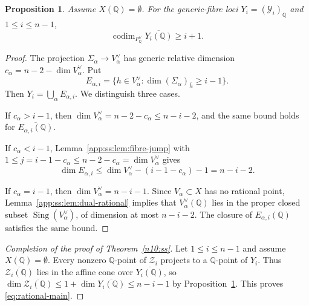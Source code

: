 \documentclass[a4paper,11pt, twoside,reqno]{amsart}
\theoremstyle{plain}
\newtheorem{prop}[thm]{Proposition}
\theoremstyle{definition}
\theoremstyle{remark}
\newcommand{\QQ}{\mathbb{Q}}
\DeclareMathOperator{\codim}{codim}
\DeclareMathOperator{\Sing}{Sing}
\renewcommand{\bar}{\overline}
\renewcommand{\le}{\leqslant}
\renewcommand{\leq}{\leqslant}
\renewcommand{\geq}{\geqslant}
\numberwithin{equation}{section}
\begin{document}
\begin{prop}\label{app:ss:prop:rational-projective}
Assume $X(\QQ)=\emptyset$. For the generic-fibre loci
$Y_i=(\mathcal Y_i)_\QQ$ and $1\leq i\leq n-1$,
\begin{equation*}
 \codim_{P^\vee_\QQ}\bar{Y_i(\QQ)}\geq i+1.
\end{equation*}
\end{prop}
\begin{proof}
The projection $\Sigma_\alpha\to V_\alpha^\vee$ has generic relative
dimension $c_\alpha=n-2-\dim V_\alpha^\vee$. Put
\[
 E_{\alpha,i}=\{h\in V_\alpha^\vee:
                       \dim(\Sigma_\alpha)_{\bar h}\geq i-1\}.
\]
Then $Y_i=\bigcup_\alpha E_{\alpha,i}$. We distinguish three cases.

If $c_\alpha>i-1$, then
$\dim V_\alpha^\vee=n-2-c_\alpha\leq n-i-2$, and the same bound
holds for $\bar{E_{\alpha,i}(\QQ)}$.

If $c_\alpha<i-1$, Lemma~\ref{app:ss:lem:fibre-jump} with
$1\le j=i-1-c_\alpha\le n-2-c_\alpha=\dim V_\alpha^\vee$ gives
\[
 \dim E_{\alpha,i}
 \leq\dim V_\alpha^\vee-(i-1-c_\alpha)-1=n-i-2.
\]

If $c_\alpha=i-1$, then $\dim V_\alpha^\vee=n-i-1$.
Since $V_\alpha\subset X$ has no rational point,
Lemma~\ref{app:ss:lem:dual-rational} implies that $V_\alpha^\vee(\QQ)$ lies in the proper
closed subset $\Sing(V_\alpha^\vee)$, of dimension at most $n-i-2$.
The closure of $E_{\alpha,i}(\QQ)$ satisfies the same bound.
\end{proof}

\begin{proof}[Completion of the proof of Theorem~\ref{n10:ss}]
Let $1\le i\le n-1$ and assume $X(\QQ)=\emptyset$.
Every nonzero $\QQ$-point of $\mathcal Z_i$ projects to a $\QQ$-point of $Y_i$.
Thus $\bar{\mathcal Z_i(\QQ)}$ lies in the affine cone over $\bar{Y_i(\QQ)}$,
so $\dim \bar{\mathcal Z_i(\QQ)} \le 1 + \dim \bar{Y_i(\QQ)}
\le n-i-1$ by Proposition~\ref{app:ss:prop:rational-projective}.
This proves \eqref{eq:rational-main}.
\end{proof}
\end{document}
